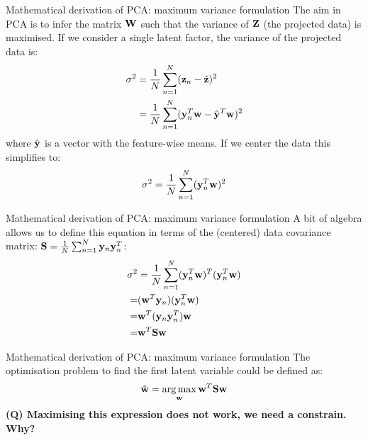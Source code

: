 \documentclass[aspectratio=169,notes]{beamer}
\begin{document}

	\begin{frame}{Mathematical derivation of PCA: maximum variance formulation}
	The aim in PCA is to infer the matrix ${\bf W}$ such that the variance of ${\bf Z}$ (the projected data) is maximised. If we consider a single latent factor, the variance of the projected data is:
	\begin{align*}
		\sigma^2 &= \frac{1}{N}\sum_{n=1}^{N} ({\bf z}_n - \hat{{\bf z}})^{2} \\
				 &= \frac{1}{N}\sum_{n=1}^{N} ({\bf y}_n^T {\bf w} - \hat{{\bf y}}^T{\bf w})^{2}
	\end{align*}
	where $\hat{{\bf y}}$ is a vector with the feature-wise means. If we center the data this simplifies to:
	\begin{equation*}
		\sigma^2 = \frac{1}{N}\sum_{n=1}^{N} ({\bf y}_n^T {\bf w})^{2}
	\end{equation*}
	\end{frame}

	\begin{frame}{Mathematical derivation of PCA: maximum variance formulation}
	A bit of algebra allows us to define this equation in terms of the (centered) data covariance matrix: ${\bf S} = \frac{1}{N}\sum_{n=1}^{N} {\bf y}_n{\bf y}_n^T$:
	\begin{align*}
		\sigma^2 &= \frac{1}{N}\sum_{n=1}^{N} ({\bf y}_n^T {\bf w})^T ({\bf y}_n^T {\bf w}) \\
		=& ({\bf w}^T {\bf y}_n) ({\bf y}_n^T {\bf w}) \\
		=& {\bf w}^T ({\bf y}_n {\bf y}_n^T) {\bf w} \\
		=& {\bf w}^T {\bf S} {\bf w}
	\end{align*}
	\end{frame}

	\begin{frame}{Mathematical derivation of PCA: maximum variance formulation}
	The optimisation problem to find the first latent variable could be defined as:
	\[
		\hat{{\bf w}} = \operatorname*{arg\,max}_{{\bf w}} {\bf w}^T {\bf S} {\bf w}
	\]
	\leavevmode\newline
	\textbf{(Q) Maximising this expression does not work, we need a constrain. Why?}
	\end{frame}
\end{document}
